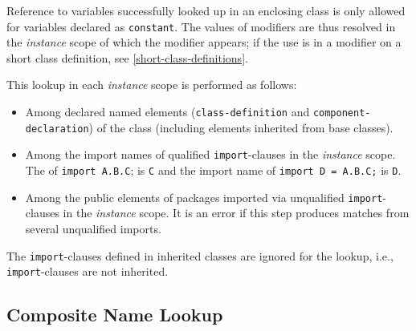 Reference to variables successfully looked up in an enclosing class is only allowed for variables declared as \lstinline!constant!.
The values of modifiers are thus resolved in the \emph{instance} scope of which the modifier appears; if the use is in a modifier on a short class definition, see \cref{short-class-definitions}.

This lookup in each \emph{instance} scope is performed as follows:
\begin{itemize}
\item
  Among declared named elements (\lstinline!class-definition! and \lstinline!component-declaration!) of the class (including elements inherited from base classes).
\item
  Among the import names of qualified \lstinline!import!-clauses in the \emph{instance} scope.
  The  of \lstinline!import A.B.C!; is \lstinline!C! and the import name of \lstinline!import D = A.B.C;! is \lstinline!D!.
\item
  Among the public elements of packages imported via unqualified \lstinline!import!-clauses in the \emph{instance} scope.
  It is an error if this step produces matches from several unqualified imports.
\end{itemize}

The \lstinline!import!-clauses defined in inherited classes are ignored for the lookup, i.e., \lstinline!import!-clauses are not inherited.


\subsection{Composite Name Lookup}\label{composite-name-lookup}

